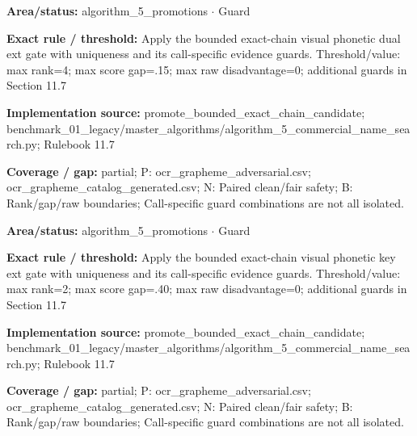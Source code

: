 \begin{tcolorbox}[enhanced,breakable,colback=white,colframe=Muted!45,boxrule=0.45pt,arc=1.5pt,left=6pt,right=6pt,top=5pt,bottom=5pt,title={\texttt{A5-CHAIN-VISUAL-PHONETIC-DUAL-EXT}},title after break={\texttt{A5-CHAIN-VISUAL-PHONETIC-DUAL-EXT}\ (continued)},fonttitle=\headingfont\bfseries\color{Navy},coltitle=Navy]
\textbf{Area/status:} algorithm\_\allowbreak{}5\_\allowbreak{}promotions $\boldsymbol{\cdot}$ Guard\par
\smallskip
\textbf{Exact rule / threshold:} Apply the bounded exact-chain visual phonetic dual ext gate with uniqueness and its call-specific evidence guards. Threshold/\allowbreak{}value: max rank=4; max score gap=.15; max raw disadvantage=0; additional guards in Section 11.7\par
\smallskip
\textbf{Implementation source:} promote\_\allowbreak{}bounded\_\allowbreak{}exact\_\allowbreak{}chain\_\allowbreak{}candidate; benchmark\_\allowbreak{}01\_\allowbreak{}legacy/\allowbreak{}master\_\allowbreak{}algorithms/\allowbreak{}algorithm\_\allowbreak{}5\_\allowbreak{}commercial\_\allowbreak{}name\_\allowbreak{}search.py; Rulebook 11.7\par
\smallskip
\textbf{Coverage / gap:} partial; P: ocr\_\allowbreak{}grapheme\_\allowbreak{}adversarial.csv; ocr\_\allowbreak{}grapheme\_\allowbreak{}catalog\_\allowbreak{}generated.csv; N: Paired clean/\allowbreak{}fair safety; B: Rank/\allowbreak{}gap/\allowbreak{}raw boundaries; Call-specific guard combinations are not all isolated.
\end{tcolorbox}
\begin{tcolorbox}[enhanced,breakable,colback=white,colframe=Muted!45,boxrule=0.45pt,arc=1.5pt,left=6pt,right=6pt,top=5pt,bottom=5pt,title={\texttt{A5-CHAIN-VISUAL-PHONETIC-KEY-EXT}},title after break={\texttt{A5-CHAIN-VISUAL-PHONETIC-KEY-EXT}\ (continued)},fonttitle=\headingfont\bfseries\color{Navy},coltitle=Navy]
\textbf{Area/status:} algorithm\_\allowbreak{}5\_\allowbreak{}promotions $\boldsymbol{\cdot}$ Guard\par
\smallskip
\textbf{Exact rule / threshold:} Apply the bounded exact-chain visual phonetic key ext gate with uniqueness and its call-specific evidence guards. Threshold/\allowbreak{}value: max rank=2; max score gap=.40; max raw disadvantage=0; additional guards in Section 11.7\par
\smallskip
\textbf{Implementation source:} promote\_\allowbreak{}bounded\_\allowbreak{}exact\_\allowbreak{}chain\_\allowbreak{}candidate; benchmark\_\allowbreak{}01\_\allowbreak{}legacy/\allowbreak{}master\_\allowbreak{}algorithms/\allowbreak{}algorithm\_\allowbreak{}5\_\allowbreak{}commercial\_\allowbreak{}name\_\allowbreak{}search.py; Rulebook 11.7\par
\smallskip
\textbf{Coverage / gap:} partial; P: ocr\_\allowbreak{}grapheme\_\allowbreak{}adversarial.csv; ocr\_\allowbreak{}grapheme\_\allowbreak{}catalog\_\allowbreak{}generated.csv; N: Paired clean/\allowbreak{}fair safety; B: Rank/\allowbreak{}gap/\allowbreak{}raw boundaries; Call-specific guard combinations are not all isolated.
\end{tcolorbox}
